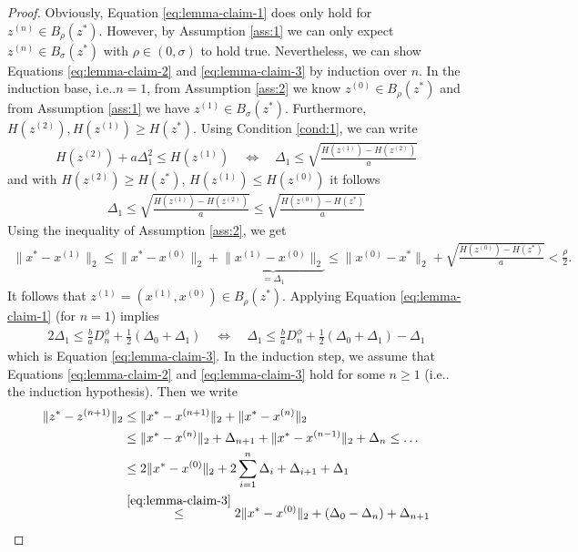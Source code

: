 \documentclass[onecolumn,final,a4paper,13pt,reqno]{siamart}
\makeatletter
\DeclareRobustCommand\onedot{\futurelet\@let@token\@onedot}
\def\@onedot{\ifx\@let@token.\else.\null\fi\xspace}
\def\ie{{i.e}\onedot} \def\Ie{{I.e}\onedot}
\makeatother
\begin{document}
\begin{proof}
	Obviously, Equation \eqref{eq:lemma-claim-1} does only hold for $z^{(n)} \in B_\rho(z^\ast)$. However, by Assumption \ref{ass:1} we can only expect $z^{(n)} \in B_\sigma(z^\ast)$ with $\rho \in (0, \sigma)$ to hold true. Nevertheless, we can show Equations \eqref{eq:lemma-claim-2} and \eqref{eq:lemma-claim-3} by induction over $n$. In the induction base, \ie $n = 1$, from Assumption \ref{ass:2} we know $z^{(0)} \in B_\rho(z^\ast)$ and from Assumption \ref{ass:1} we have $z^{(1)} \in B_\sigma(z^\ast)$. Furthermore, $H(z^{(2)}), H(z^{(1)}) \geq H(z^\ast)$. Using Condition \ref{cond:1}, we can write
	\begin{align}
		H(z^{(2)}) + a\Delta_1^2 \leq H(z^{(1)})\quad\Leftrightarrow\quad \Delta_1 \leq \sqrt{\frac{H(z^{(1)}) - H(z^{(2)})}{a}}
	\end{align}
	and with $H(z^{(2)}) \geq H(z^\ast)$, $H(z^{(1)}) \leq H(z^{(0)})$ it follows
	\begin{align}
		\Delta_1 \leq \sqrt{\frac{H(z^{(1)}) - H(z^{(2)})}{a}} \leq \sqrt{\frac{H(z^{(0)}) - H(z^\ast)}{a}}\label{eq:lemma-ib}
	\end{align}
	Using the inequality of Assumption \ref{ass:2}, we get
	\begin{align}
		\|x^\ast - x^{(1)}\|_2 \leq \|x^\ast - x^{(0)}\|_2 + \underbrace{\|x^{(1)} - x^{(0)}\|_2}_{=\Delta_1} \leq \|x^{(0)} - x^\ast\|_2 + \sqrt{\frac{H(z^{(0)}) - H(z^\ast)}{a}} < \frac{\rho}{2}.
	\end{align}
	It follows that $z^{(1)} = (x^{(1)}, x^{(0)}) \in B_\rho(z^\ast)$. Applying Equation \eqref{eq:lemma-claim-1} (for $n = 1$) implies
	\begin{align}
		2\Delta_1 \leq \frac{b}{a} D_n^\phi + \frac{1}{2}(\Delta_0 + \Delta_1) \quad\Leftrightarrow\quad \Delta_1 \leq \frac{b}{a} D_n^\phi + \frac{1}{2}(\Delta_0 + \Delta_1) - \Delta_1
	\end{align}
	which is Equation \eqref{eq:lemma-claim-3}. In the induction step, we assume that Equations \eqref{eq:lemma-claim-2} and \eqref{eq:lemma-claim-3} hold for some $n \geq 1$ (\ie the induction hypothesis). Then we write
	\begin{align}
		\|z^\ast - z^{(n + 1)}\|_2 &\leq \|x^\ast - x^{(n + 1)}\|_2 + \|x^\ast - x^{(n)}\|_2\\
		&\leq \|x^\ast - x^{(n)}\|_2 + \Delta_{n + 1} + \|x^\ast - x^{(n - 1)}\|_2 + \Delta_n \leq \ldots\\
		&\leq 2\|x^\ast - x^{(0)}\|_2 + 2\sum_{i = 1}^n \Delta_i + \Delta_{i + 1} + \Delta_1\\
		&\overset{\eqref{eq:lemma-claim-3}}{\leq} 2\|x^\ast - x^{(0)}\|_2 + (\Delta_0 - \Delta_n) + \Delta_{n + 1}\\

\end{align}
\end{proof}
\end{document}
